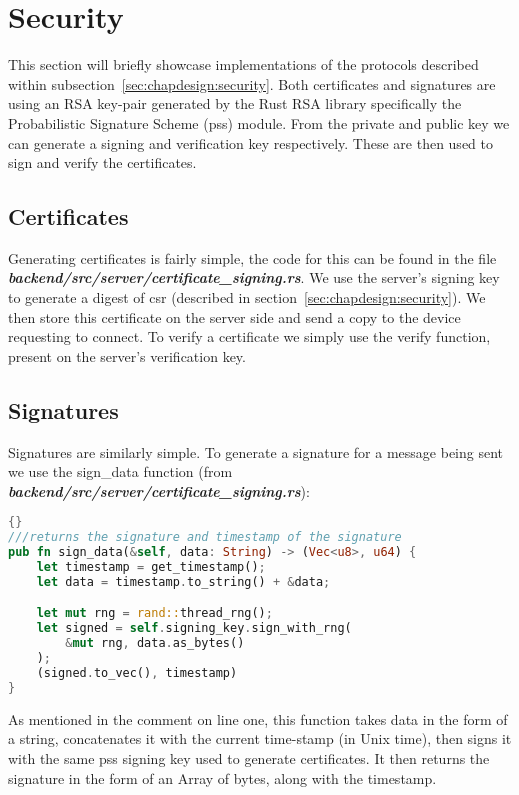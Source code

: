 \section{Security} \label{sec:chapimpl:security}
This section will briefly showcase implementations of the protocols described within subsection~\ref{sec:chapdesign:security}. Both certificates and signatures are using an RSA key-pair generated by the Rust RSA library specifically the Probabilistic Signature Scheme (pss) module. From the private and public key we can generate a signing and verification key respectively. These are then used to sign and verify the certificates.

\subsection{Certificates} \label{sec:chapimpl:security:certificates}
Generating certificates is fairly simple, the code for this can be found in the file \textit{\textbf{backend/src/server/certificate\_signing.rs}}. We use the server's signing key to generate a digest of csr (described in section~\ref{sec:chapdesign:security}). We then store this certificate on the server side and send a copy to the device requesting to connect. To verify a certificate we simply use the verify function, present on the server's verification key.

\subsection{Signatures} \label{sec:chapimpl:security:signatures}
Signatures are similarly simple. To generate a signature for a message being sent we use the sign\_data function (from \textit{\textbf{backend/src/server/certificate\_signing.rs}}):
\begin{lstlisting}[language=Rust, style=boxed, showstringspaces=false]{}
///returns the signature and timestamp of the signature
pub fn sign_data(&self, data: String) -> (Vec<u8>, u64) {
    let timestamp = get_timestamp();
    let data = timestamp.to_string() + &data;

    let mut rng = rand::thread_rng();
    let signed = self.signing_key.sign_with_rng(
        &mut rng, data.as_bytes()
    );
    (signed.to_vec(), timestamp)
}
\end{lstlisting}
As mentioned in the comment on line one, this function takes data in the form of a string, concatenates it with the current time-stamp (in Unix time), then signs it with the same pss signing key used to generate certificates. It then returns the signature in the form of an Array of bytes, along with the timestamp.

